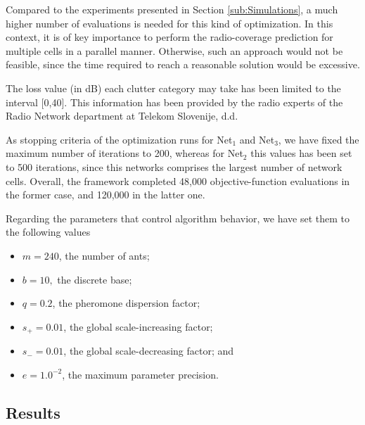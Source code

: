 Compared to the experiments presented in Section \ref{sub:Simulations},
a much higher number of evaluations is needed for this kind of optimization.
In this context, it is of key importance to perform the radio-coverage
prediction for multiple cells in a parallel manner. Otherwise, such
an approach would not be feasible, since the time required to reach
a reasonable solution would be excessive.

The loss value (in dB) each clutter category may take has been limited
to the interval {[}0,40{]}. This information has been provided by
the radio experts of the Radio Network department at Telekom Slovenije,
d.d.

As stopping criteria of the optimization runs for Net$_{1}$ and Net$_{3}$,
we have fixed the maximum number of iterations to 200, whereas for
Net$_{2}$ this values has been set to 500 iterations, since this
networks comprises the largest number of network cells. Overall, the
framework completed 48,000 objective-function evaluations in the former
case, and 120,000 in the latter one.

Regarding the parameters that control algorithm behavior, we have
set them to the following values
\begin{itemize}
\item $m=240$, the number of ants;
\item $b=10,$ the discrete base;
\item $q=0.2$, the pheromone dispersion factor;
\item $s_{+}=0.01$, the global scale-increasing factor;
\item $s_{-}=0.01$, the global scale-decreasing factor; and 
\item $e=1.0^{-2}$, the maximum parameter precision.
\end{itemize}

\subsection{Results}

